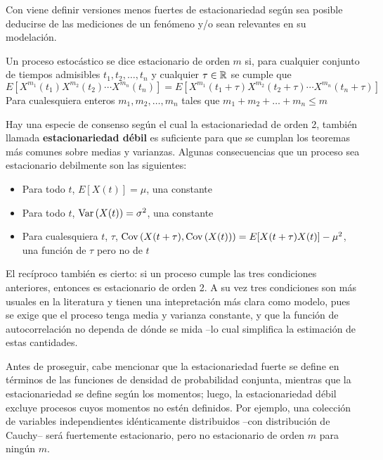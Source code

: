 \documentclass[12pt,a4paper]{mitthesis}
\begin{document}

Con viene definir versiones menos fuertes de estacionariedad seg\'un sea posible deducirse de
las mediciones de un fen\'omeno y/o sean relevantes en su modelaci\'on.

\begin{defn}
Un proceso estoc\'astico se dice estacionario de orden $m$ si, para cualquier 
conjunto de tiempos admisibles $t_1,t_2,\dots,t_n$ y cualquier $\tau \in \mathbb{R}$
se cumple que
\begin{equation*}
E\left[ X^{m_1}(t_1)X^{m_2}(t_2)\cdots X^{m_n}(t_n) \right]
=
E\left[ X^{m_1}(t_1+\tau)X^{m_2}(t_2+\tau)\cdots X^{m_n}(t_n+\tau) \right]
\end{equation*}
Para cualesquiera enteros $m_1,m_2,\dots,m_n$ tales que $m_1+m_2+\dots+m_n \leq m$
\end{defn}

Hay una especie de consenso seg\'un el cual la estacionariedad de orden 2, tambi\'en
llamada \textbf{estacionariedad d\'ebil} es suficiente para
que se cumplan los teoremas m\'as comunes sobre medias y varianzas.
Algunas consecuencias que un
proceso sea estacionario debilmente son las siguientes:
\begin{itemize}
\item Para todo $t$, $E[X(t)] = \mu$, una constante
\item Para todo $t$, $\mathrm{Var}\left( X(t) \right) = \sigma^{2}$, una constante
\item Para cualesquiera $t$, $\tau$, $\mathrm{Cov}\left( X(t+\tau),\mathrm{Cov}\left( X(t) \right) \right) = E[X(t+\tau)X(t)] - \mu^{2}$, 
una funci\'on de $\tau$ pero no de $t$
\end{itemize}

El rec\'iproco tambi\'en es cierto: si un proceso cumple las tres condiciones anteriores,
entonces es estacionario de orden 2. A su vez tres condiciones son m\'as usuales en la literatura
y tienen una intepretaci\'on m\'as clara como modelo, pues se exige que el proceso tenga media
y varianza constante, y que la funci\'on de autocorrelaci\'on no dependa de d\'onde se mida --lo
cual simplifica la estimaci\'on de estas cantidades.

Antes de proseguir, cabe mencionar que la estacionariedad fuerte se define
en t\'erminos de las funciones de densidad de probabilidad conjunta, mientras que la 
estacionariedad se define seg\'un los momentos; luego, la estacionariedad d\'ebil excluye 
procesos cuyos momentos no est\'en definidos. Por ejemplo, una colecci\'on de variables
independientes id\'enticamente distribuidos --con distribuci\'on de Cauchy-- ser\'a
fuertemente estacionario, pero no estacionario de orden $m$ para ning\'un $m$. 
\end{document}
